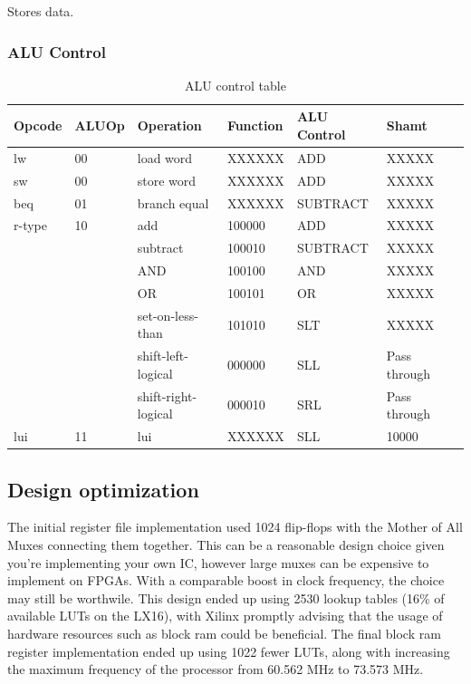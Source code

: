 Stores data.

\subsubsection{ALU Control}

\begin{table}[ht!]
    \begin{tabular}{|l|l|l|l|l|l|l|}
    \hline
    Opcode & ALUOp & Operation           & Function & ALU Control & Shamt   \\ \hline
    lw     & 00    & load word           & XXXXXX   & ADD         & XXXXX \\ \hline
    sw     & 00    & store word          & XXXXXX   & ADD         & XXXXX \\ \hline
    beq    & 01    & branch equal        & XXXXXX   & SUBTRACT    & XXXXX \\ \hline
    r-type & 10    & add                 & 100000   & ADD         & XXXXX \\ \cline{3-6}
           &       & subtract            & 100010   & SUBTRACT    & XXXXX \\ \cline{3-6}
           &       & AND                 & 100100   & AND         & XXXXX \\ \cline{3-6}
           &       & OR                  & 100101   & OR          & XXXXX \\ \cline{3-6}
           &       & set-on-less-than    & 101010   & SLT         & XXXXX \\ \cline{3-6}
           &       & shift-left-logical  & 000000   & SLL         & Pass through \\ \cline{3-6}
           &       & shift-right-logical & 000010   & SRL         & Pass through \\ \hline
    lui    & 11    & lui                 & XXXXXX   & SLL         & 10000 \\ \hline
    \end{tabular}
    \caption{ALU control table}
    \label{tab:alu-control}
\end{table}

\subsection{Design optimization}

The initial register file implementation used 1024 flip-flops with the Mother of All Muxes connecting them together. This can be a reasonable design choice given you're implementing your own IC, however large muxes can be expensive to implement on FPGAs. With a comparable boost in clock frequency, the choice may still be worthwile.
This design ended up using 2530 lookup tables (16\% of available LUTs on the LX16), with Xilinx promptly advising that the usage of hardware resources such as block ram could be beneficial.
The final block ram register implementation ended up using 1022 fewer LUTs, along with increasing the maximum frequency of the processor from 60.562 MHz to 73.573 MHz.

